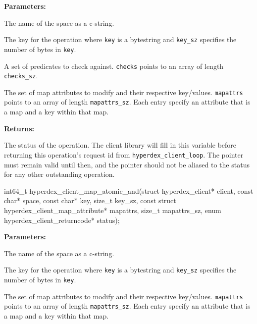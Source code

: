 \noindent\textbf{Parameters:}
\begin{description}[labelindent=\widthof{{\texttt{mapattrs}, \texttt{mapattrs\_sz}}},leftmargin=*,noitemsep,nolistsep,align=right]
\item[\texttt{space}] The name of the space as a c-string.
\item[\texttt{key}, \texttt{key\_sz}] The key for the operation where \texttt{key} is a bytestring and \texttt{key\_sz} specifies the number of bytes in \texttt{key}.
\item[\texttt{checks}, \texttt{checks\_sz}] A set of predicates to check against.  \texttt{checks} points to an array of length \texttt{checks\_sz}.
\item[\texttt{mapattrs}, \texttt{mapattrs\_sz}] The set of map attributes to modify and their respective key/values.  \texttt{mapattrs} points to an array of length \texttt{mapattrs\_sz}.  Each entry specify an attribute that is a map and a key within that map.
\end{description}

\noindent\textbf{Returns:}
\begin{description}[labelindent=\widthof{{\texttt{status}}},leftmargin=*,noitemsep,nolistsep,align=right]
\item[\texttt{status}] The status of the operation.  The client library will fill in this variable before returning this operation's request id from \texttt{hyperdex\_client\_loop}.  The pointer must remain valid until then, and the pointer should not be aliased to the status for any other outstanding operation.
\end{description}

\funcsep
{}
\begin{ccode}
int64_t hyperdex_client_map_atomic_and(struct hyperdex_client* client,
                const char* space,
                const char* key, size_t key_sz,
                const struct hyperdex_client_map_attribute* mapattrs, size_t mapattrs_sz,
                enum hyperdex_client_returncode* status);
\end{ccode}
\funcdesc 

\noindent\textbf{Parameters:}
\begin{description}[labelindent=\widthof{{\texttt{mapattrs}, \texttt{mapattrs\_sz}}},leftmargin=*,noitemsep,nolistsep,align=right]
\item[\texttt{space}] The name of the space as a c-string.
\item[\texttt{key}, \texttt{key\_sz}] The key for the operation where \texttt{key} is a bytestring and \texttt{key\_sz} specifies the number of bytes in \texttt{key}.
\item[\texttt{mapattrs}, \texttt{mapattrs\_sz}] The set of map attributes to modify and their respective key/values.  \texttt{mapattrs} points to an array of length \texttt{mapattrs\_sz}.  Each entry specify an attribute that is a map and a key within that map.
\end{description}

